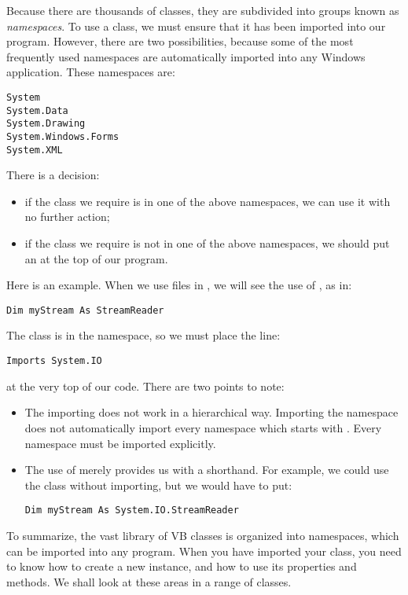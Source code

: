 		Because there are thousands of classes, they are subdivided into groups known as \emph{namespaces}. To use a class, we must ensure that it has been imported into our program. However, there are two possibilities, because some of the most frequently used namespaces are automatically imported into any Windows application. These namespaces are:
		\begin{lstlisting}
System
System.Data
System.Drawing
System.Windows.Forms
System.XML
		\end{lstlisting}
		There is a decision:
		\begin{itemize}
			\item if the class we require is in one of the above namespaces, we can use it with no further action;
			\item if the class we require is not in one of the above namespaces, we should put an  at the top of our program.
		\end{itemize}
		Here is an example. When we use files in , we will see the use of , as in:
		\begin{lstlisting}
Dim myStream As StreamReader
		\end{lstlisting}
		The  class is in the  namespace, so we must place the line:
		\begin{lstlisting}
Imports System.IO
		\end{lstlisting}
		at the very top of our code.
		There are two points to note:
		\begin{itemize}
			\item The importing does not work in a hierarchical way. Importing the  namespace does not automatically import every namespace which starts with . Every namespace must be imported explicitly.
			\item The use of  merely provides us with a shorthand. For example, we could use the  class without importing, but we would have to put:
				\begin{lstlisting}
Dim myStream As System.IO.StreamReader
				\end{lstlisting}
		\end{itemize}
		To summarize, the vast library of VB classes is organized into namespaces, which can be imported into any program. When you have imported your class, you need to know how to create a new instance, and how to use its properties and methods. We shall look at these areas in a range of classes.


